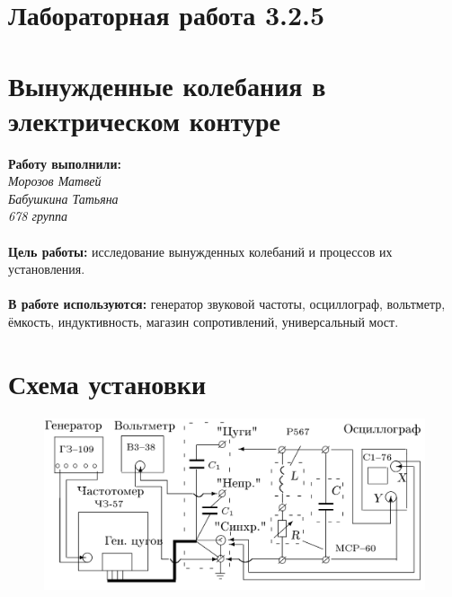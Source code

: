 \documentclass[11pt,a4paper]{article}
\begin{document}
	\part*{Лабораторная работа 3.2.5}
	\part*{Вынужденные колебания в электрическом контуре}
	\textbf{Работу выполнили:} \\
	{\itshape Морозов Матвей \\ Бабушкина Татьяна \\ 678 группа} \\\\
\textbf{Цель работы:} исследование вынужденных колебаний и процессов их установления.
\\\\
\textbf {В работе используются:} генератор звуковой частоты, осциллограф, вольтметр, ёмкость, индуктивность, магазин сопротивлений, универсальный мост.
\\
\part*{Схема установки}
\begin{figure}[h!]
	\centering
	\includegraphics[width=0.8\linewidth]{2}

\end{figure}
\newpage
\end{document}
